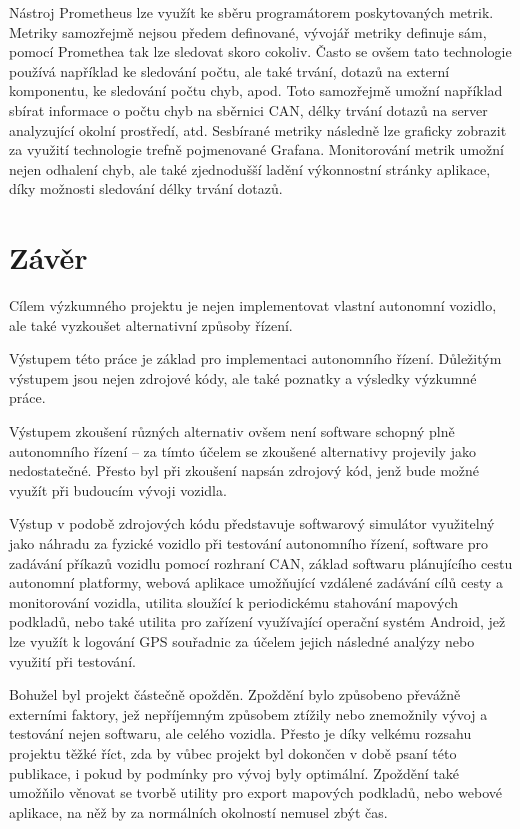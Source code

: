 \documentclass[czech, bachelor]{diploma}
\begin{document}
Nástroj Prometheus lze využít ke sběru programátorem poskytovaných metrik. Metriky samozřejmě nejsou předem definované, vývojář
metriky definuje sám, pomocí Promethea tak lze sledovat skoro cokoliv. Často se ovšem tato technologie používá například
ke sledování počtu, ale také trvání, dotazů na externí komponentu, ke sledování počtu chyb, apod. Toto samozřejmě umožní například
sbírat informace o počtu chyb na sběrnici CAN, délky trvání dotazů na server analyzující okolní prostředí, atd. Sesbírané metriky
následně lze graficky zobrazit za využití technologie trefně pojmenované Grafana. Monitorování metrik umožní nejen odhalení chyb,
ale také zjednodušší ladění výkonnostní stránky aplikace, díky možnosti sledování délky trvání dotazů.

\chapter{Závěr}

Cílem výzkumného projektu je nejen implementovat vlastní autonomní vozidlo, ale také vyzkoušet alternativní způsoby řízení. 

Výstupem této práce je základ pro implementaci autonomního řízení. Důležitým výstupem jsou nejen zdrojové kódy, ale také poznatky
a výsledky výzkumné práce. 

Výstupem zkoušení různých alternativ ovšem není software schopný plně autonomního řízení -- za tímto účelem se zkoušené
alternativy projevily jako nedostatečné. Přesto byl při zkoušení napsán zdrojový kód, jenž bude možné využít při budoucím vývoji
vozidla. 

Výstup v podobě zdrojových kódu představuje softwarový simulátor využitelný jako náhradu za fyzické vozidlo při testování 
autonomního řízení, software pro zadávání příkazů vozidlu pomocí rozhraní CAN, základ softwaru plánujícího cestu autonomní 
platformy, webová aplikace umožňující vzdálené zadávání cílů cesty a monitorování vozidla, utilita sloužící k periodickému
stahování mapových podkladů, nebo také utilita pro zařízení využívající operační systém Android, jež lze využít k logování GPS 
souřadnic za účelem jejich následné analýzy nebo využití při testování.

Bohužel byl projekt částečně opožděn. Zpoždění bylo způsobeno převážně externími faktory, jež nepříjemným způsobem ztížily nebo
znemožnily vývoj a testování nejen softwaru, ale celého vozidla. Přesto je díky velkému rozsahu projektu těžké říct, zda by vůbec
projekt byl dokončen v době psaní této publikace, i pokud by podmínky pro vývoj byly optimální. Zpoždění také umožňilo věnovat se 
tvorbě utility pro export mapových podkladů, nebo webové aplikace, na něž by za normálních okolností nemusel zbýt čas.
\end{document}
